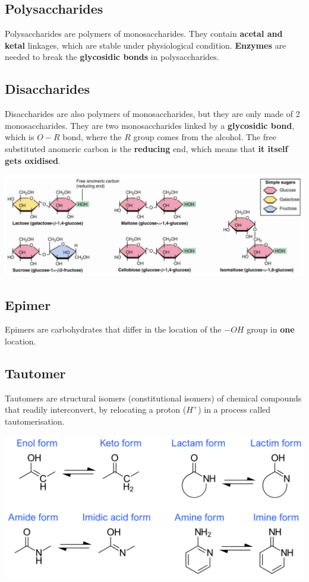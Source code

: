 \documentclass[11pt]{article}
\begin{document}
\subsection{Polysaccharides}
\label{sec:orgf6e34c1}
Polysaccharides are polymers of monosaccharides. They contain \textbf{acetal and ketal} linkages, which are stable under physiological condition. \textbf{Enzymes} are needed to break the \textbf{glycosidic bonds} in polysaccharides.
\subsection{Disaccharides}
\label{sec:org4b71a9f}
Disaccharides are also polymers of monosaccharides, but they are only made of 2 monosaccharides. They are two monosaccharides linked by a \textbf{glycosidic bond}, which is \(O-R\) bond, where the \(R\) group comes from the alcohol. The free substituted anomeric carbon is the \textbf{reducing} end, which means that \textbf{it itself gets oxidised}.
\begin{center}
\includegraphics[width=.9\linewidth]{./images/disaccharides.png}
\end{center}
\subsection{Epimer}
\label{sec:org01024fa}
Epimers are carbohydrates that differ in the location of the \(-OH\) group in \textbf{one} location.
\subsection{Tautomer}
\label{sec:org34cf47d}
Tautomers are structural isomers (constitutional isomers) of chemical compounds that readily interconvert, by relocating a proton (\(H^+\)) in a process called tautomerisation.
\begin{center}
\includegraphics[width=.9\linewidth]{./images/tautomers.png}
\end{center}
\end{document}
